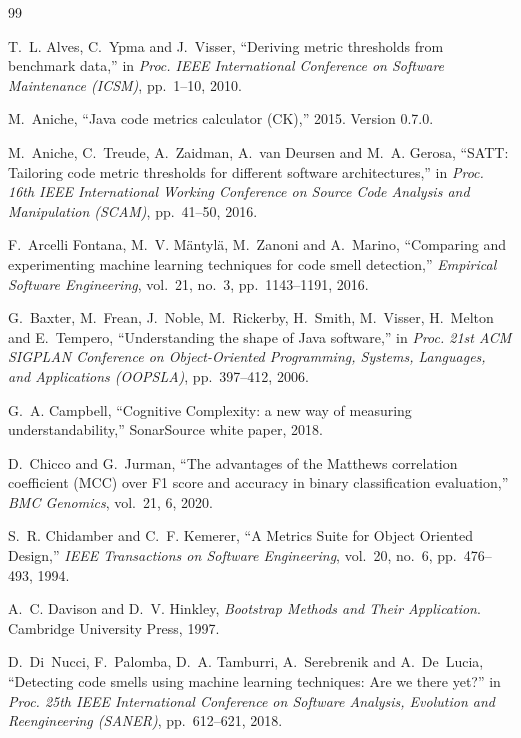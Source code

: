 \documentclass[11pt,a4paper]{article}
\begin{document}
\begin{thebibliography}{99}

 T.~L. Alves, C.~Ypma and J.~Visser,
  ``Deriving metric thresholds from benchmark data,''
  in \emph{Proc. IEEE International Conference on Software Maintenance (ICSM)},
  pp.~1--10, 2010.

 M.~Aniche,
  ``Java code metrics calculator (CK),'' 2015. Version 0.7.0.

 M.~Aniche, C.~Treude, A.~Zaidman, A.~van Deursen and
  M.~A. Gerosa,
  ``SATT: Tailoring code metric thresholds for different software
  architectures,''
  in \emph{Proc. 16th IEEE International Working Conference on Source Code
  Analysis and Manipulation (SCAM)}, pp.~41--50, 2016.

 F.~Arcelli Fontana, M.~V. M\"antyl\"a, M.~Zanoni and
  A.~Marino,
  ``Comparing and experimenting machine learning techniques for code smell
  detection,''
  \emph{Empirical Software Engineering}, vol.~21, no.~3, pp.~1143--1191, 2016.

 G.~Baxter, M.~Frean, J.~Noble, M.~Rickerby, H.~Smith,
  M.~Visser, H.~Melton and E.~Tempero,
  ``Understanding the shape of Java software,''
  in \emph{Proc. 21st ACM SIGPLAN Conference on Object-Oriented Programming,
  Systems, Languages, and Applications (OOPSLA)}, pp.~397--412, 2006.

 G.~A. Campbell,
  ``Cognitive Complexity: a new way of measuring understandability,''
  SonarSource white paper, 2018.

 D.~Chicco and G.~Jurman,
  ``The advantages of the Matthews correlation coefficient (MCC) over F1 score
  and accuracy in binary classification evaluation,''
  \emph{BMC Genomics}, vol.~21, 6, 2020.

 S.~R. Chidamber and C.~F. Kemerer,
  ``A Metrics Suite for Object Oriented Design,''
  \emph{IEEE Transactions on Software Engineering}, vol.~20, no.~6,
  pp.~476--493, 1994.

 A.~C. Davison and D.~V. Hinkley,
  \emph{Bootstrap Methods and Their Application}. Cambridge University Press,
  1997.

 D.~Di~Nucci, F.~Palomba, D.~A. Tamburri, A.~Serebrenik
  and A.~De~Lucia,
  ``Detecting code smells using machine learning techniques: Are we there
  yet?''
  in \emph{Proc. 25th IEEE International Conference on Software Analysis,
  Evolution and Reengineering (SANER)}, pp.~612--621, 2018.


\end{thebibliography}
\end{document}
